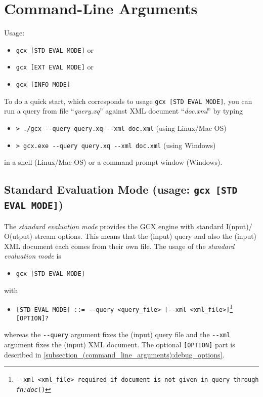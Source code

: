 \section{Command-Line Arguments}
\label{section:command-line_arguments}
Usage:
\begin{itemize}
  \setlength{\itemsep}{0pt}
  \item[] \texttt{gcx [STD EVAL MODE]} or
  \item[] \texttt{gcx [EXT EVAL MODE]} or
  \item[] \texttt{gcx [INFO MODE]}
\end{itemize}

\noindent To do a quick start, which corresponds to usage \texttt{gcx [STD EVAL MODE]}, you can run a query from file \enquote{\emph{query.xq}} against XML document \enquote{\emph{doc.xml}} by typing
\begin{itemize}
  \setlength{\itemsep}{0pt}
  \item[] \texttt{> ./gcx {-}{-}query query.xq {-}{-}xml doc.xml} (using Linux/Mac OS)
  \item[] \texttt{> gcx.exe {-}{-}query query.xq {-}{-}xml doc.xml} (using Windows)
\end{itemize}

\noindent in a shell (Linux/Mac OS) or a command prompt window (Windows).

\subsection{Standard Evaluation Mode (usage: \texttt{gcx [STD EVAL MODE]})}
The \emph{standard evaluation mode} provides the GCX engine with standard I(nput)/ O(utput) stream options. This means that the (input) query and also the (input) XML document each comes from their own file. The usage of the \emph{standard evaluation mode} is
\begin{itemize}
  \setlength{\itemsep}{0pt}
  \item[] \texttt{gcx [STD EVAL MODE]}
\end{itemize}

\noindent with
\begin{itemize}
  \setlength{\itemsep}{0pt}
  \item[] \texttt{[STD EVAL MODE] ::= {-}{-}query <query\_file> [{-}{-}xml <xml\_file>]\footnote{{-}{-}xml <xml\_file> required if document is not given in query through \emph{fn:doc}()} [OPTION]?}
\end{itemize}

\noindent whereas the \texttt{{-}{-}query} argument fixes the (input) query file and the \texttt{{-}{-}xml} argument fixes the (input) XML document. The optional \texttt{[OPTION]} part is described in \autoref{subsection_(command_line_arguments):debug_options}.

